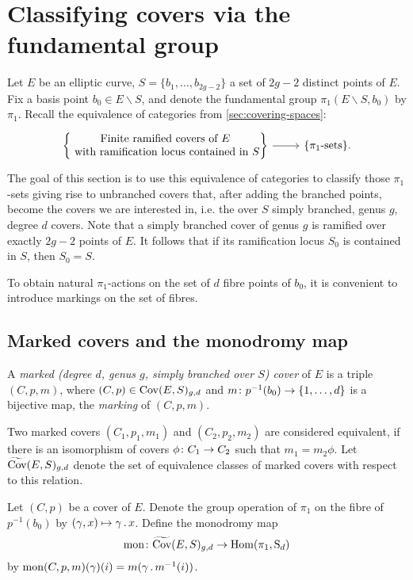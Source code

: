 \section{Classifying covers via the fundamental group}

Let $E$ be an elliptic curve, $S=\{b_1,\dotsc,b_{2g-2}\}$ a set of $2g-2$ distinct points of $E$. Fix a basis point $b_0\in E\smallsetminus S$, and denote the fundamental group $\pi_1(E\smallsetminus S, b_0)$ by $\pi_1$.
Recall the equivalence of categories from \ref{sec:covering-spaces}:
\[
 \begin{tikzcd}
  \begin{Bmatrix}\text{Finite ramified covers of }E\\\text{ with ramification locus contained in $S$}\end{Bmatrix} \arrow{r} & \{\pi_1\text{-sets}\}.
 \end{tikzcd}
\]
The goal of this section is to use this equivalence of categories to classify those $\pi_1$-sets giving rise to unbranched covers that, after adding the branched points, become the covers we are interested in, i.e. the over $S$ simply branched, genus $g$, degree $d$ covers. Note that a simply branched cover of genus $g$ is ramified over exactly $2g-2$ points of $E$. It follows that if its ramification locus $S_0$ is contained in $S$, then $S_0 = S$.

To obtain natural $\pi_1$-actions on the set of $d$ fibre points of $b_0$, it is convenient to introduce markings on the set of fibres.

\subsection{Marked covers and the monodromy map}

\begin{defi}
 A \emph{marked (degree $d$, genus $g$, simply branched over $S$) cover} of $E$ is a triple $(C,p,m)$, where $(C,p)\in \operatorname{Cov}(E,S)_{g,d}$ and $m\colon p^{-1}(b_0)\to \{1,\dotsc,d\}$ is a bijective map, the \emph{marking} of $(C,p,m)$.
 
 Two marked covers $(C_1,p_1,m_1)$ and $(C_2,p_2,m_2)$ are considered equivalent, if there is an isomorphism of covers $\phi\colon C_1 \to C_2$ such that $m_1=m_2\phi$. Let $\widetilde{\operatorname{Cov}}(E,S)_{g,d}$ denote the set of equivalence classes of marked covers with respect to this relation.
\end{defi}

\begin{defi}
 Let $(C,p)$ be a cover of $E$. Denote the group operation of $\pi_1$ on the fibre of $p^{-1}(b_0)$ by $(\gamma,x)\mapsto \gamma\,.\, x$. Define the monodromy map \[\operatorname{mon}\colon \widetilde{\operatorname{Cov}}(E,S)_{g,d} \to \operatorname{Hom}(\pi_1, \operatorname{S}_d)\]
 by $\operatorname{mon}(C,p,m)(\gamma)(i)=m(\gamma\,.\, m^{-1}(i))$.
\end{defi}

